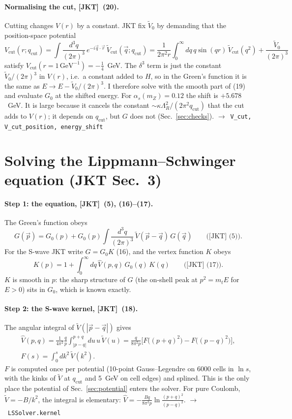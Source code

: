 \documentclass[11pt]{article}
\newcommand{\code}[1]{\texttt{#1}}
\newcommand{\alphas}{\alpha_s}
\newcommand{\JKT}{[JKT]}
\newcommand{\Vh}{\hat V}
\newcommand{\qc}{q_\mathrm{cut}}
\newcommand{\fn}[1]{\hfill$\to$~\code{#1}}
\begin{document}
\paragraph{Normalising the cut, \JKT\ (20).}
Cutting changes $V(r)$ by a constant. JKT fix $\tilde V_0$ by demanding that the position-space potential
$$
V_\mathrm{cut}(r;\qc)=\int\!\frac{d^3q}{(2\pi)^3}\,e^{-i\vec q\cdot\vec r}\,\tilde V_\mathrm{cut}(\vec q;\qc)
=\frac{1}{2\pi^2r}\int_0^\infty\!dq\,q\sin(qr)\,\tilde V_\mathrm{cut}(q^2)+\frac{\tilde V_0}{(2\pi)^3}
$$
satisfy $V_\mathrm{cut}(r=1\,\mathrm{GeV}^{-1})=-\tfrac14$~GeV. The $\delta^3$ term is just the constant
$\tilde V_0/(2\pi)^3$ in $V(r)$, i.e.\ a constant added to $H$, so in the Green's function it is the same as
$E\to E-\tilde V_0/(2\pi)^3$. I therefore solve with the smooth part of (19) and evaluate $G_0$ at the shifted energy.
For $\alphas(m_Z)=0.12$ the shift is $+5.678$~GeV. It is large because it cancels the constant $\sim\kappa\Lambda_R^2/(2\pi^2\qc)$
that the cut adds to $V(r)$; it depends on $\qc$, but $G$ does not (Sec.~\ref{sec:checks}).
\fn{V\_cut, V\_cut\_position, energy\_shift}

\section{Solving the Lippmann--Schwinger equation (JKT Sec.~3)}
\label{sec:solver}

\paragraph{Step 1: the equation, \JKT\ (5), (16)--(17).}
The Green's function obeys
$$
G(\vec p)=G_0(p)+G_0(p)\int\!\frac{d^3q}{(2\pi)^3}\,\tilde V(\vec p-\vec q)\,G(\vec q)\qquad\text{(\JKT\ (5))}.
$$
For the S-wave JKT write $G=G_0K$ (16), and the vertex function $K$ obeys
$$
K(p)=1+\int_0^\infty\!dq\,\Vh(p,q)\,G_0(q)\,K(q)\qquad\text{(\JKT\ (17))}.
$$
$K$ is smooth in $p$: the sharp structure of $G$ (the on-shell peak at $p^2=m_tE$ for $E>0$) sits in $G_0$, which is known exactly.

\paragraph{Step 2: the S-wave kernel, \JKT\ (18).}
The angular integral of $\tilde V(|\vec p-\vec q|)$ gives
\begin{gather*}
\Vh(p,q)=\frac{1}{4\pi^2}\frac qp\int_{|p-q|}^{p+q}\!du\,u\,\tilde V(u)=\frac{q}{8\pi^2p}\Big[F\big((p+q)^2\big)-F\big((p-q)^2\big)\Big],\\
F(s)=\int_0^s\!dk^2\,\tilde V(k^2).
\end{gather*}
$F$ is computed once per potential (10-point Gauss--Legendre on 6000 cells in $\ln s$, with the kinks of $\tilde V$ at $\qc$ and
5~GeV on cell edges) and splined. This is the only place the potential of Sec.~\ref{sec:potential} enters the solver. For pure
Coulomb, $\tilde V=-B/k^2$, the integral is elementary: $\Vh=-\frac{Bq}{8\pi^2p}\ln\frac{(p+q)^2}{(p-q)^2}$.
\fn{LSSolver.kernel}
\end{document}
